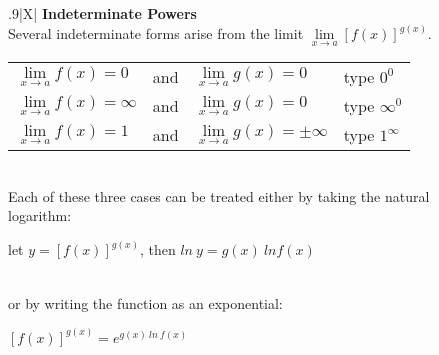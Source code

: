 \documentclass{article}
\begin{document}
\begin{center}
\large
\def\arraystretch{1.3}
{\setlength{\tabcolsep}{16pt}
\begin{tabularx}{.9\textwidth}{|X|}
\hline
	\vspace{1pt}
	\textbf{Indeterminate Powers} \: \\\vspace{1pt}
	Several indeterminate forms arise from the limit $\underset{x \to a}{\lim} [f(x)]^{g(x)}$. \\
	{\begin{tabular}{l l l l}
	$\underset{x \to a}{\lim} f(x)=0$  & and &  $\underset{x \to a}{\lim} g(x)=0$ & \hspace{32pt} type $0^0$ \\
	$\underset{x \to a}{\lim} f(x)=\infty$  & and &  $\underset{x \to a}{\lim} g(x)=0$ & \hspace{32pt} type $\infty^0$ \\
	$\underset{x \to a}{\lim} f(x)=1$ & and & $\underset{x \to a}{\lim} g(x)=\pm\infty$ & \hspace{32pt} type $1^\infty$ \\
	\end{tabular}}
	\\
	\vspace{1pt}
	Each of these three cases can be treated either by taking the natural \\ logarithm: 
	\begin{center}
	let \hspace{12pt} $y=[f(x)]^{g(x)}$, \hspace{12pt} then \hspace{12pt} $ln \> y = g(x) \> ln f(x)$ \\
	\end{center} \\
	or by writing the function as an exponential:
	\begin{center}
	$[f(x)]^{g(x)} = e^{g(x) \> ln \> f(x)}$ \\
	\end{center} \\
	\hline
\end{tabularx}}
\end{center}
\vspace{24pt}
\end{document}
